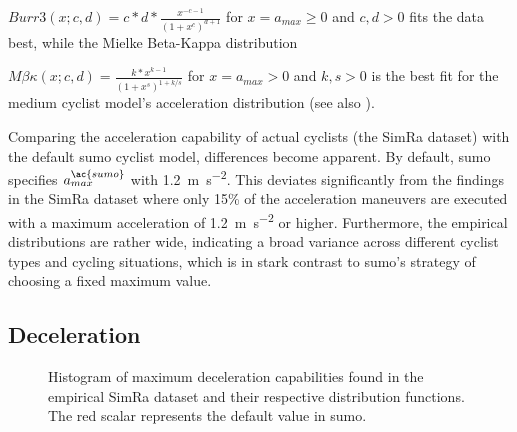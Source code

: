 $Burr3(x; c,d) = c*d*\frac{x^{-c-1}}{(1+x^c)^{d+1}}$ for $x = a_{max} \geq 0$ and $c,d > 0$ fits the data best, while the Mielke Beta-Kappa distribution~\cite{mielke1973distribution} 

$M\beta\kappa(x; c,d) = \frac{k*x^{k-1}}{(1+x^s)^{1+k/s}}$ for $x = a_{max} > 0$ and $k,s > 0$ is the best fit for the medium cyclist model's acceleration distribution (see also ).

Comparing the acceleration capability of actual cyclists (the SimRa dataset) with the default \ac{sumo} cyclist model, differences become apparent.
By default, \ac{sumo} specifies $a_{max}^{\ac{sumo}}$ with \SI{1.2}{\metre\per\square\second}.
This deviates significantly from the findings in the SimRa dataset where only \num{15}\% of the acceleration maneuvers are executed with a maximum acceleration of \SI{1.2}{\metre\per\square\second} or higher.
Furthermore, the empirical distributions are rather wide, indicating a broad variance across different cyclist types and cycling situations, which is in stark contrast to \ac{sumo}'s strategy of choosing a fixed maximum value.

\subsection{Deceleration}
\label{subsec:deceleration_preprocessing}

\begin{figure}
    \centering
    \hfill
    \caption{%
        Histogram of maximum deceleration capabilities found in the empirical SimRa dataset and their respective distribution functions.
        The red scalar represents the default value in \ac{sumo}.
    }%
    \label{fig:analysis_max_deceleration_dist_fit}
\end{figure}

